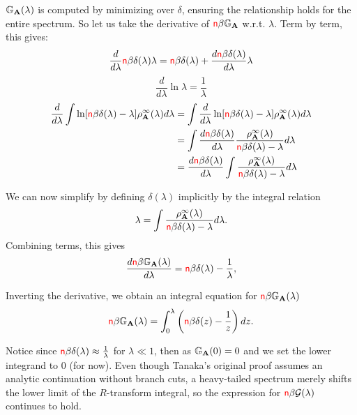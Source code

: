 $\mathbb{G}_{\mathbf{A}}(\lambda)$ is computed by minimizing over $\delta$, ensuring the relationship holds for the entire spectrum.
So let us take the derivative of ${\color{red}\sf{n}}\beta\mathbb{G}_{\mathbf{A}}$ w.r.t. $\lambda$. 
Term by term, this gives:
\begin{equation}
\dfrac{d}{d\lambda} {\color{red}\sf{n}}\beta\delta(\lambda)\lambda = {\color{red}\sf{n}}\beta\delta(\lambda) + \dfrac{d {\color{red}\sf{n}}\beta\delta(\lambda)}{d\lambda} \lambda
\end{equation}
\begin{equation}
\dfrac{d}{d\lambda} \ln\lambda = \dfrac{1}{\lambda}
\end{equation}
\begin{align}
\dfrac{d}{d\lambda} \int \ln[{\color{red}\sf{n}}\beta\delta(\lambda) - \lambda] \rho^{\infty}_{\mathbf{A}}(\lambda) d\lambda
&= \int \dfrac{d}{d\lambda} \ln[{\color{red}\sf{n}}\beta\delta(\lambda) - \lambda] \rho^{\infty}_{\mathbf{A}}(\lambda) d\lambda \\ \nonumber
&= \int \dfrac{d {\color{red}\sf{n}}\beta\delta(\lambda)}{d\lambda}\dfrac{ \rho^{\infty}_{\mathbf{A}}(\lambda)}{{\color{red}\sf{n}}\beta\delta(\lambda) - \lambda}d\lambda  \\ \nonumber
&=  \dfrac{d {\color{red}\sf{n}}\beta\delta(\lambda)}{d\lambda}\int\dfrac{ \rho^{\infty}_{\mathbf{A}}(\lambda)}{{\color{red}\sf{n}}\beta\delta(\lambda) - \lambda}d\lambda
\end{align}

We can now simplify by defining $\delta(\lambda)$ implicitly by the integral relation
\begin{equation}
\lambda = \int \frac{\rho^{\infty}_{\mathbf{A}}(\lambda)}{{\color{red}\sf{n}}\beta\delta(\lambda) - \lambda} d\lambda.
\end{equation}
Combining terms, this gives
\begin{equation}
\frac{d{\color{red}\sf{n}}\beta\mathbb{G}_{\mathbf{A}}(\lambda)}{d\lambda} = {\color{red}\sf{n}}\beta\delta(\lambda) - \frac{1}{\lambda},
\end{equation}

 Inverting the derivative, we obtain an integral equation for ${\color{red}\sf{n}}\beta\mathbb{G}_{\mathbf{A}}(\lambda)$ 
\begin{equation}
{\color{red}\sf{n}}\beta\mathbb{G}_{\mathbf{A}}(\lambda) = \int_0^\lambda \left({\color{red}\sf{n}}\beta\delta(z) - \frac{1}{z}\right) dz.
\end{equation}

Notice since  ${\color{red}\sf{n}}\beta\delta(\lambda) \approx \frac{1}{\lambda}$ for $\lambda \ll 1$, then
as $\mathbb{G}_{\mathbf{A}}(0) = 0$ and we set the lower integrand to $0$ (for now).  Even though Tanaka’s original proof assumes an analytic continuation without branch cuts, a heavy-tailed spectrum merely shifts the lower limit of the $R$-transform integral, so the expression for ${\color{red}\sf{n}}\beta\mathcal G(\lambda)$ continues to hold.


